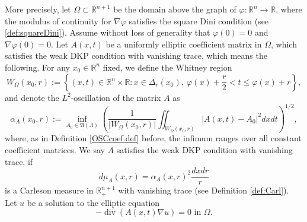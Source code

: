 \documentclass[11pt, a4paper,leqno]{amsart}
\theoremstyle{plain}
\theoremstyle{definition}
\theoremstyle{remark}
\numberwithin{equation}{section}
\newcommand{\RR}{{\mathbb{R}}}
\DeclareMathOperator{\divg}{div}
\begin{document}
More precisely, let $\Omega \subset \RR^{n+1}$ be the domain above the graph of $\varphi: \RR^n \to \RR$, where the modulus of continuity for $\nabla \varphi$ satisfies the square Dini condition (see \eqref{def:squareDini}). 
%
Assume without loss of generality that $\varphi(0) = 0$ and $\nabla \varphi(0) = 0$. Let $A(x,t)$ be a uniformly elliptic coefficient matrix in $\Omega$, which satisfies the weak DKP condition with vanishing trace, which means the following. 
For any $x_0 \in \RR^n$ fixed, we define the Whitney region
\[ W_\Omega(x_0, r) := \left\{(x,t) \in \RR^n \times \RR: x\in \Delta_r(x_0), ~\varphi(x)+\frac{r}{2} < t \leq \varphi(x) + r \right\}, \]
and denote the $L^2$-oscillation of the matrix $A$ as
\begin{equation}\label{def:oscA}
	\alpha_A(x_0,r) := \inf_{A_0 \in \mathfrak{A}(\Lambda)} \left( \frac{1}{|W_\Omega(x_0,r)|} \iint_{W_\Omega(x_0,r)} |A(x,t) - A_0|^2 dxdt \right)^{1/2}, 
\end{equation} 
where, as in Definition \ref{OSCcoef.def} before, the infimum ranges over all constant coefficient matrices. We say $A$ satisfies the weak DKP condition with vanishing trace, if 
\begin{equation}\label{def:muA}
	d\mu_A(x, r) = \alpha_A(x,r)^2 \frac{ dx dr}{r} 
\end{equation} 
is a Carleson measure in $\RR^{n+1}_+$ with vanishing trace (see Definition \ref{def:Carl}).
Let $u$ be a solution to the elliptic equation
\[ -\divg(A(x,t) \nabla u) = 0 \text{ in } \Omega. \]
\end{document}
